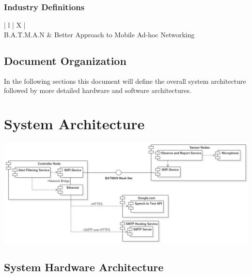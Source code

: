 \documentclass[11pt,a4paper]{article}
\begin{document}
\subsubsection{Industry Definitions}
\begin{center}
\begin{tabularx}{\textwidth}{ | l | X | }
	\hline
	 \\
	\hline
	B.A.T.M.A.N		& Better Approach to Mobile Ad-hoc Networking \\
	\hline
\end{tabularx}
\end{center}

\subsection{Document Organization}
\textnormal{In the following sections this document will define the overall system architecture followed by more detailed hardware and software architectures. }

\section{System Architecture}
\begin{center}
	\includegraphics[width=\textwidth, keepaspectratio=true]{Graphics/SystemArchitecture.png}
\end{center}

\subsection{System Hardware Architecture}
\end{document}
